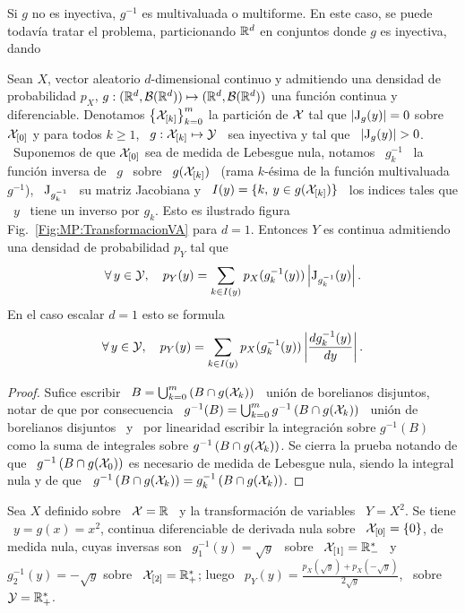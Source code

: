 Si $g$ no es inyectiva, $g^{-1}$  es multivaluada o multiforme. En este caso, se
puede todav\'ia  tratar el problema, particionando $\mathbb{R}^d$  en conjuntos donde
$g$ es inyectiva, dando
%
\begin{teorema}
  Sean $X$, vector aleatorio  $d$-dimensional continuo y admitiendo una densidad
  de  probabilidad   $p_X$,  $g:(\mathbb{R}^d  ,  \mathcal{B}(\mathbb{R}^d))   \mapsto  (\mathbb{R}^d  ,
  \mathcal{B}(\mathbb{R}^d))$  una  funci\'on continua  y  diferenciable.  Denotamos  $\left\{
    \mathcal{X}_{[k]} \right\}_{k=0}^m$ la partici\'on  de $\mathcal{X}$ tal que $\left| \operatorname{J}_g(y)
  \right| = 0$ sobre  $\mathcal{X}_{[0]}$ y para todos $k \ge 1$,  \ $g: \mathcal{X}_{[k]} \mapsto
  \mathcal{Y}$ \ sea inyectiva y tal que \ $\left| \operatorname{J}_g(y) \right| > 0$. \ Suponemos de
  que  $\mathcal{X}_{[0]}$ sea  de medida  de Lebesgue  nula, notamos  \ $g_k^{-1}$  \ la
  funci\'on inversa de  \ $g$ \ sobre \ $g(\mathcal{X}_{[k]})$ \  (rama $k$-\'esima de la
  funci\'on multivaluada $g^{-1}$), \  $\operatorname{J}_{g_k^{-1}}$ \ su matriz Jacobiana y
  \ $I(y) = \{ k, \: y \in g(\mathcal{X}_{[k]}) \}$ \ los indices tales que \ $y$ \ tiene
  un      inverso     por      $g_k$.      Esto      es      ilustrado     figura
  Fig.~\ref{Fig:MP:TransformacionVA}  para $d  = 1$.   Entonces $Y$  es continua
  admitiendo una densidad de probabilidad $p_Y$ tal que
  \[
  \forall  \, y  \in \mathcal{Y},  \quad p_Y(y)  = \sum_{k  \in  I(y)} p_X(g_k^{-1}(y))
  \left| \operatorname{J}_{g_k^{-1}}(y) \right|.
  \]
  En el caso escalar $d = 1$ esto se formula
  \[
  \forall \, y \in \mathcal{Y}, \quad  p_Y(y) = \sum_{k \in I(y)} p_X(g_k^{-1}(y)) \left|
    \frac{d g_k^{-1}(y)}{dy} \right|.
  \]
\end{teorema}
%
\begin{proof}
  Sufice escribir  \ $B  = \bigcup_{k =  0}^m \left(  B \cap g(\mathcal{X}_k)  \right)$ \
  uni\'on de borelianos disjuntos, notar  de que por consecuencia \ $g^{-1}(B) =
  \bigcup_{k =0}^m g^{-1}\left( B \cap  g(\mathcal{X}_k) \right)$ \ uni\'on de borelianos
  disjuntos \  y \  por linearidad escribir  la integraci\'on  sobre $g^{-1}(B)$
  como la  suma de  integrales sobre $g^{-1}\left(  B \cap g(\mathcal{X}_k)  \right)$. Se
  cierra la  prueba notando de  que \ $g^{-1}\left(  B \cap g(\mathcal{X}_0)  \right)$ es
  necesario  de medida de  Lebesgue nula,  siendo la  integral nula  y de  que \
  $g^{-1}\left( B \cap g(\mathcal{X}_k) \right) = g_k^{-1}\left( B \cap g(\mathcal{X}_k) \right)$.
\end{proof}
%

\begin{ejemplo}
  Sea $X$ definido sobre  \ $\mathcal{X} = \mathbb{R}$ \ y la  transformaci\'on de variables \
  $Y = X^2$.   Se tiene \ $y  = g(x) = x^2$, continua  diferenciable de derivada
  nula  sobre \  $\mathcal{X}_{[0]} =  \{ 0  \}$, de  medida nula,  cuyas inversas  son \
  $g_1^{-1}(y) = \sqrt{y}$ \ sobre \ $\mathcal{X}_{[1]} = \mathbb{R}_-^*$ \ y \ $g_2^{-1}(y) =
  -   \sqrt{y}$  sobre   \   $\mathcal{X}_{[2]}   =  \mathbb{R}_+^*$;   luego   \  $p_Y(y)   =
  \frac{p_X(\sqrt{y})  +   p_X(-\sqrt{y})}{2  \sqrt{y}}$,   \  sobre  \   $\mathcal{Y}  =
  \mathbb{R}_+^*$.
\end{ejemplo}

